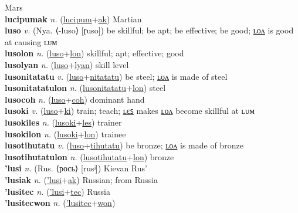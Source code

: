 Mars \label{lucipum} \\
\textbf{lucipumak} \textit{n.} (\hyperref[lucipum]{lucipum}+\hyperref[ak]{ak})
Martian \label{lucipumak} \\
\textbf{luso} \textit{v.} (Nya. ⟨-luso⟩ [ɽuso])
be skillful; be apt; be effective; be good; \hyperref[lusolon]{ʟᴏᴧ} is good at causing ʟᴜᴍ \label{luso} \\
\textbf{lusolon} \textit{n.} (\hyperref[luso]{luso}+\hyperref[lon]{lon})
skillful; apt; effective; good \label{lusolon} \\
\textbf{lusolyan} \textit{n.} (\hyperref[luso]{luso}+\hyperref[lyan]{lyan})
skill level \label{lusolyan} \\
\textbf{lusonitatatu} \textit{v.} (\hyperref[luso]{luso}+\hyperref[nitatatu]{nitatatu})
be steel; \hyperref[lusonitatatulon]{ʟᴏᴧ} is made of steel \label{lusonitatatu} \\
\textbf{lusonitatatulon} \textit{n.} (\hyperref[lusonitatatu]{lusonitatatu}+\hyperref[lon]{lon})
steel \label{lusonitatatulon} \\
\textbf{lusocoh} \textit{n.} (\hyperref[luso]{luso}+\hyperref[coh]{coh})
dominant hand \label{lusocoh} \\
\textbf{lusoki} \textit{v.} (\hyperref[luso]{luso}+\hyperref[ki]{ki})
train; teach; \hyperref[lusokiles]{ʟєꜱ} makes \hyperref[lusokilon]{ʟᴏᴧ} become skillful at ʟᴜᴍ \label{lusoki} \\
\textbf{lusokiles} \textit{n.} (\hyperref[lusoki]{lusoki}+\hyperref[les]{les})
trainer \label{lusokiles} \\
\textbf{lusokilon} \textit{n.} (\hyperref[lusoki]{lusoki}+\hyperref[lon]{lon})
trainee \label{lusokilon} \\
\textbf{lusotihutatu} \textit{v.} (\hyperref[luso]{luso}+\hyperref[tihutatu]{tihutatu})
be bronze; \hyperref[lusotihutatulon]{ʟᴏᴧ} is made of bronze \label{lusotihutatu} \\
\textbf{lusotihutatulon} \textit{n.} (\hyperref[lusotihutatu]{lusotihutatu}+\hyperref[lon]{lon})
bronze \label{lusotihutatulon} \\
\textbf{'lusi} \textit{n.} (Rus. ⟨рось⟩ [rusʲ])
Kievan Rus’ \label{'lusi} \\
\textbf{'lusiak} \textit{n.} (\hyperref['lusi]{'lusi}+\hyperref[ak]{ak})
Russian; from Russia \label{'lusiak} \\
\textbf{'lusitec} \textit{n.} (\hyperref['lusi]{'lusi}+\hyperref[tec]{tec})
Russia \label{'lusitec} \\
\textbf{'lusitecwon} \textit{n.} (\hyperref['lusitec]{'lusitec}+\hyperref[won]{won})
